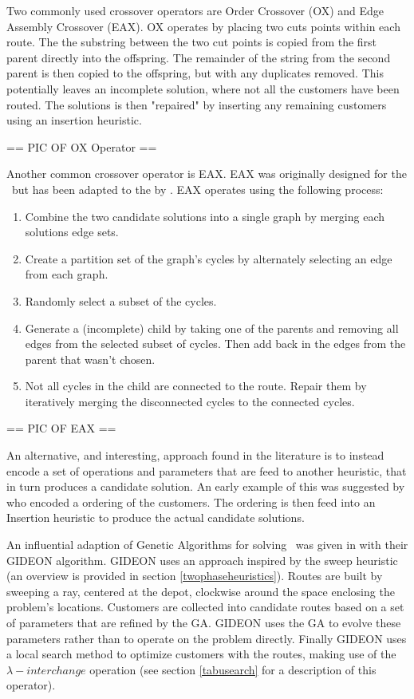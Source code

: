 Two commonly used crossover operators are Order Crossover (OX) and Edge Assembly Crossover (EAX). OX \cite{OSH:1987} operates by placing two cuts points within each route. The the substring between the two cut points is copied from the first parent directly into the offspring. The remainder of the string from the second parent is then copied to the offspring, but with any duplicates removed. This potentially leaves an incomplete solution, where not all the customers have been routed. The solutions is then "repaired" by inserting any remaining customers using an insertion heuristic.

== PIC OF OX Operator == 

Another common crossover operator is EAX. EAX was originally designed for the \TSP\ but has been adapted to the \VRP by \cite{Nagata:2007}. EAX operates using the following process:

\begin{enumerate}
    \item Combine the two candidate solutions into a single graph by merging each solutions edge sets.
    \item Create a partition set of the graph's cycles by alternately selecting an edge from each graph.
    \item Randomly select a subset of the cycles.
    \item Generate a (incomplete) child by taking one of the parents and removing all edges from the selected subset of cycles. Then add back in the edges from the parent that wasn't chosen. 
    \item Not all cycles in the child are connected to the route. Repair them by iteratively merging the disconnected cycles to the connected cycles.
\end{enumerate}

== PIC OF EAX ==

An alternative, and interesting, approach found in the literature is to instead encode a set of operations and parameters that are feed to another heuristic, that in turn produces a candidate solution. An early example of this was suggested by \cite{??} who encoded a ordering of the customers. The ordering is then feed into an Insertion heuristic to produce the actual candidate solutions.

An influential adaption of Genetic Algorithms for solving \VRPTW\ was given in \cite{TNJ:1991} with their GIDEON algorithm. GIDEON uses an approach inspired by the sweep heuristic (an overview is provided in section \ref{twophaseheuristics}). Routes are built by sweeping a ray, centered at the depot, clockwise around the space enclosing the problem's locations. Customers are collected into candidate routes based on a set of parameters that are refined by the GA. GIDEON uses the GA to evolve these parameters rather than to operate on the problem directly. Finally GIDEON uses a local search method to optimize customers with the routes, making use of the $\lambda-interchange$ operation (see section \ref{tabusearch} for a description of this operator).

